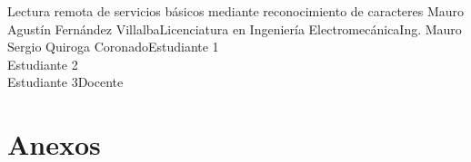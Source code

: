 \documentclass{upb_class}
\begin{document}
\frontmatter
	\begin{caratula}{Lectura remota de servicios básicos mediante reconocimiento de caracteres}
		{Mauro Agustín Fernández Villalba}{Licenciatura en Ingeniería Electromecánica}{Ing. Mauro Sergio Quiroga Coronado}{Estudiante 1 \\ Estudiante 2 \\ Estudiante 3}{Docente}
	\end{caratula}





	\newpage 
	\tableofcontents
	\listoffigures
	\listoftables

\mainmatter

	




\newpage
	
	
\appendix
\chapter{Anexos}
\end{document}
